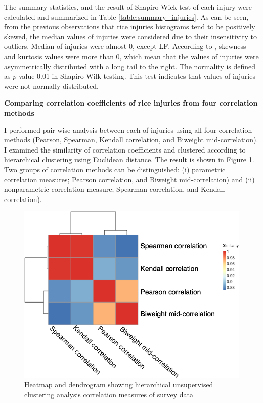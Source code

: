 

The summary statistics, and the result of Shapiro-Wick test of each injury were calculated and summarized in Table \ref{table:summary_injuries}. As can be seen, from the previous observations that rice injuries histograms tend to be positively skewed, the median values of injuries were considered due to their insensitivity to outliers. Median of injuries were almost 0, except LF. According to \citet{Doane_2011_Measuring}, skewness and kurtosis values were more than 0, which mean that the values of injuries were asymmetrically distributed with a long tail to the right. The normality is defined as $p$ value 0.01 in Shapiro-Wilk testing. This test indicates that values of injuries were not normally distributed.

\textbf{Comparing correlation coefficients of rice injuries from four correlation methods }

I performed pair-wise analysis between each of injuries using all four correlation methods (Pearson, Spearman, Kendall correlation, and Biweight mid-correlation). I examined the similarity of correlation coefficients and clustered according to hierarchical clustering using Euclidean distance. The result is shown in Figure \ref{fig:heatmap}. Two groups of correlation methods can be distinguished: (i) parametric correlation measures; Pearson correlation, and Biweight mid-correlation) and (ii) nonparametric correlation measure; Spearman correlation, and Kendall correlation).

\begin{figure}[!htbp]
\centering
\includegraphics[width = 1\textwidth]{figures/heatmap/heatmap.png}
\caption{Heatmap and dendrogram showing hierarchical unsupervised clustering analysis correlation measures of survey data}
\label{fig:heatmap}
\end{figure}

